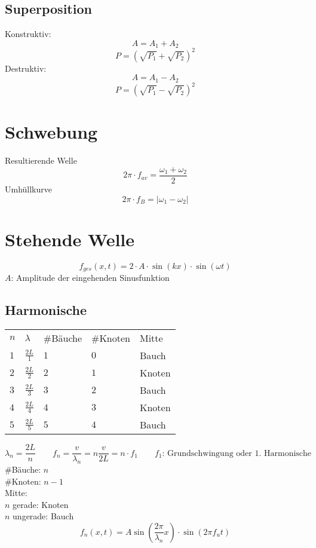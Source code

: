 \subsection{Superposition}
Konstruktiv: 
\[ \boxed{A = A_1 + A_2} \]
\[ \boxed{P = \left(\sqrt{P_1} + \sqrt{P_2}\right)^2} \]
Destruktiv: 
\[ \boxed{A = A_1 - A_2} \]
\[ \boxed{P = \left(\sqrt{P_1} - \sqrt{P_2}\right)^2} \]

\section{Schwebung}
Resultierende Welle
\[ \boxed{2 \pi \cdot f_{av} = \frac{\omega_1 + \omega_2}{2}} \]
Umhüllkurve
\[ \boxed{2 \pi \cdot f_B = |\omega_1 - \omega_2|} \]

\section{Stehende Welle}
\[ \boxed{f_{ges}(x,t) = 2 \cdot A \cdot \sin(k x) \cdot \sin(\omega t)} \]
$A$: Amplitude der eingehenden Sinusfunktion \\

\subsection{Harmonische}
\begin{tabular}{@{}lllll}
\rowcolor{white} $n$ & $\lambda$       & \#Bäuche & \#Knoten & Mitte \\
\rowcolor{lgray} $1$ & $\frac{2 L}{1}$ & $1$      & $0$      & Bauch \\
\rowcolor{white} $2$ & $\frac{2 L}{2}$ & $2$      & $1$      & Knoten \\
\rowcolor{lgray} $3$ & $\frac{2 L}{3}$ & $3$      & $2$      & Bauch \\
\rowcolor{white} $4$ & $\frac{2 L}{4}$ & $4$      & $3$      & Knoten \\
\rowcolor{lgray} $5$ & $\frac{2 L}{5}$ & $5$      & $4$      & Bauch \\
\end{tabular}
\[ \lambda_n = \frac{2 L}{n} \qquad f_n = \frac{v}{\lambda_n} 
= n \frac{v}{2 L} = n \cdot f_1 \qquad 
\text{$f_1$: Grundschwingung oder 1. Harmonische}\]
\#Bäuche: $n$ \\
\#Knoten: $n - 1$ \\
Mitte: \\
$n$ gerade: Knoten \\
$n$ ungerade: Bauch
\[ f_n(x, t) 
= A \sin\left(\frac{2 \pi}{\lambda_n} x\right) \cdot \sin(2 \pi f_u t) \]

